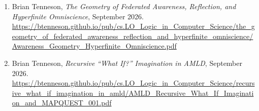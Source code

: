 \documentclass[11pt]{article}
\theoremstyle{special}
\theoremstyle{definition}
\begin{document}
\begin{enumerate}[leftmargin=2em]
\item Brian Tenneson, \emph{The Geometry of Federated Awareness, Reflection, and Hyperfinite Omniscience}, September 2026.\\
\url{https://btenneson.github.io/pub/cs.LO_Logic_in_Computer_Science/the_geometry_of_federated_awareness_reflection_and_hyperfinite_omniscience/Awareness_Geometry_Hyperfinite_Omniscience.pdf}

\item Brian Tenneson, \emph{Recursive ``What If?'' Imagination in AMLD}, September 2026.\\
\url{https://btenneson.github.io/pub/cs.LO_Logic_in_Computer_Science/recursive_what_if_imagination_in_amld/AMLD_Recursive_What_If_Imagination_and_MAPQUEST_001.pdf}
\end{enumerate}
\end{document}
